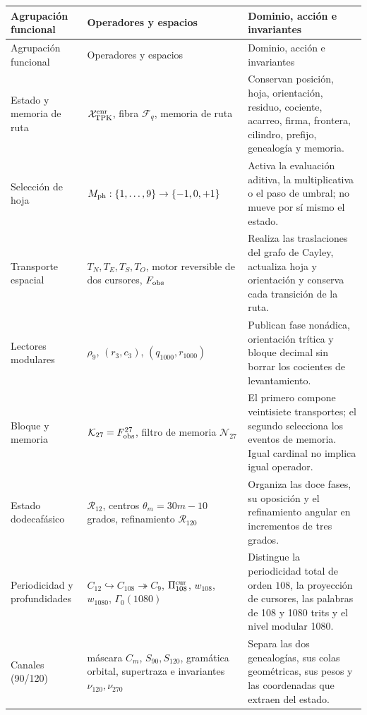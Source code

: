 \begingroup
\footnotesize
\renewcommand{\arraystretch}{1.06}
\begin{longtable}{@{}p{}p{}p{}@{}}
\toprule
Agrupación funcional & Operadores y espacios & Dominio, acción e invariantes \\
\midrule
\endfirsthead
\toprule
Agrupación funcional & Operadores y espacios & Dominio, acción e invariantes \\
\midrule
\endhead
Estado y memoria de ruta &
\(\mathcal X_{\rm TPK}^{\rm enr}\), fibra \(\mathcal F_q\), memoria de ruta &
Conservan posición, hoja, orientación, residuo, cociente, acarreo, firma,
frontera, cilindro, prefijo, genealogía y memoria. \\

Selección de hoja &
\(M_{\rm ph}:\{1,\ldots,9\}\to\{-1,0,+1\}\) &
Activa la evaluación aditiva, la multiplicativa o el paso de umbral; no
mueve por sí mismo el estado. \\

Transporte espacial &
\(T_N,T_E,T_S,T_O\), motor reversible de dos cursores,
\(F_{\rm obs}\) &
Realiza las traslaciones del grafo de Cayley, actualiza hoja y orientación y
conserva cada transición de la ruta. \\

Lectores modulares &
\(\rho_9\), \((r_3,c_3)\), \((q_{1000},r_{1000})\) &
Publican fase nonádica, orientación trítica y bloque decimal sin borrar los
cocientes de levantamiento. \\

Bloque y memoria &
\(\mathcal K_{27}=F_{\rm obs}^{27}\), filtro de memoria
\(\mathcal N_{27}\) &
El primero compone veintisiete transportes; el segundo selecciona los
eventos de memoria. Igual cardinal no implica igual operador. \\

Estado dodecafásico &
\(\mathcal R_{12}\), centros \(\theta_m=30m-10\) grados,
refinamiento \(\mathcal R_{120}\) &
Organiza las doce fases, su oposición y el refinamiento angular en incrementos de
tres grados. \\

Periodicidad y profundidades &
\(C_{12}\hookrightarrow C_{108}\twoheadrightarrow C_9\),
\(\Pi_{108}^{\rm cur}\), \(w_{108}\), \(w_{1080}\),
\(\Gamma_0(1080)\) &
Distingue la periodicidad total de orden \(108\), la proyección de cursores, las
palabras de 108 y 1080 trits y el nivel modular 1080. \\

Canales (90/120) &
máscara \(C_m\), \(S_{90},S_{120}\), gramática orbital,
supertraza e invariantes \(\nu_{120},\nu_{270}\) &
Separa las dos genealogías, sus colas geométricas, sus pesos y las
coordenadas que extraen del estado. \\


\end{longtable}
